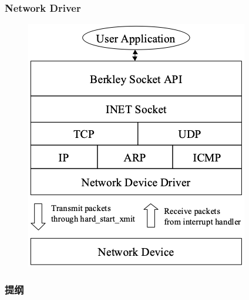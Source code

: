 % 
% 
\begin{frame}[fragile]
    \frametitle{Network Driver}
    \begin{figure}
    \includegraphics[width=0.42\linewidth]{figs/network-driver.png}
    \end{figure}
\end{frame}
% 
% 
\begin{frame}
\frametitle{提纲} %
\tableofcontents %

\end{frame}

